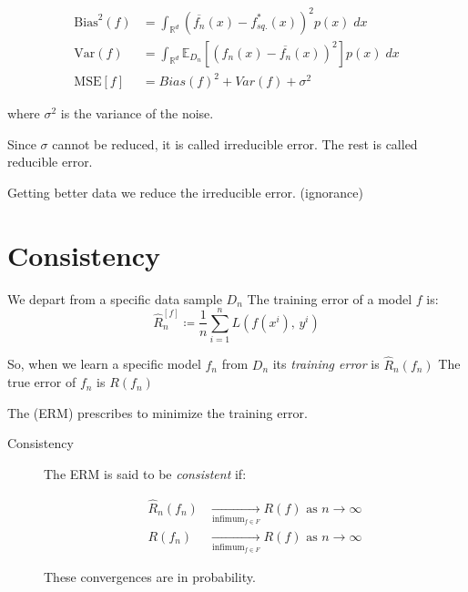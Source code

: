 \begin{align*}
	\text{Bias}^2(f) & = \int_{\mathds{R}^d} \left( \overline{f_n}(x) - f_{sq.}^*(x) \right)^2 p(x)\; dx                           \\
	\text{Var}(f)    & = \int_{\mathds{R}^d} \mathds{E}_{D_n} \left[ \left( f_n(x) - \overline{f_n}(x) \right)^2 \right] p(x)\; dx \\
	\text{MSE}[f]    & = Bias(f)^2 + Var(f) + \sigma^2
\end{align*}

where \(\sigma^2\) is the variance of the noise.

Since \(\sigma\) cannot be reduced, it is called irreducible error. The
rest is called reducible error. 

Getting better data we reduce the irreducible error. (ignorance)

\section{Consistency}

We depart from a specific data sample \(D_n\) The training error of a
model \(f\) is:
\begin{equation*}
	\hat{R}_n^{[f]} \coloneqq \frac{1}{n} \sum_{i=1}^n L(f(x^i),\, y^i)
\end{equation*}

So, when we learn a specific model \(f_n\) from \(D_n\) its
\emph{training error} is \(\hat{R}_n(f_n)\) The true error of \(f_n\)
is \(R(f_n)\)

The  (ERM) prescribes to minimize the
training error. 

\begin{description}
	\item[Consistency]
		The ERM is said to be \emph{consistent} if:

		\begin{align*}
			\hat{R}_n(f_n) & \xrightarrow[\text{infimum}_{f \in F}]{} R(f)
			\text{ as } n \rightarrow \infty                               \\
			R(f_n)         & \xrightarrow[\text{infimum}_{f \in F}]{} R(f)
			\text{ as } n \rightarrow \infty
		\end{align*}

		These convergences are in probability.
\end{description}

